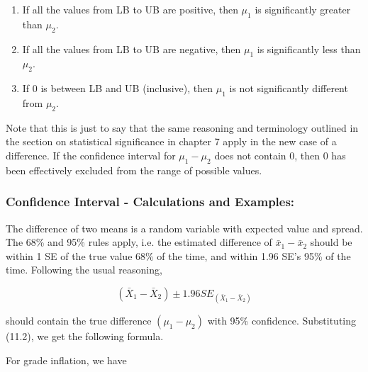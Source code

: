 \documentclass[11pt, chapterprefix=true]{scrbook}\usepackage[]{graphicx}\usepackage[]{color}
\begin{document}
\begin{enumerate}
  \item If all the values from LB to UB are positive, then 
  $\mu_1$ is significantly greater than $\mu_2$.

  \item If all the values from LB to UB are negative, then $\mu_1$ is significantly less than $\mu_2$. 

  \item If 0 is between LB and UB (inclusive), then $\mu_1$ is not significantly different from $\mu_2$.
\end{enumerate}

Note that this is just to say that the same reasoning and terminology outlined in the section on statistical significance in chapter 7 apply in the new case of a difference.  If the confidence interval for $\mu_1 - \mu_2$ does not contain 0, then 0 has been effectively excluded from the range of possible values.


\subsubsection{Confidence Interval - Calculations and Examples:}

The difference of two means is a random variable with expected value and spread.  The 68\% and 95\% rules apply, i.e. the estimated difference of $\bar{x}_1 - \bar{x}_2$ should be within 1 SE of the true value 68\% of the time, and within 1.96 SE's 95\% of the time.  Following the usual reasoning,    

\begin{equation*}
(\bar{X}_1 - \bar{X}_2) \pm 1.96 SE_{(\bar{X}_1 - \bar{X}_2)}
\end{equation*}

should contain the true difference $(\mu_1 - \mu_2)$ with 95\% confidence.  Substituting (11.2), we get the following formula.


For grade inflation, we have
\end{document}
